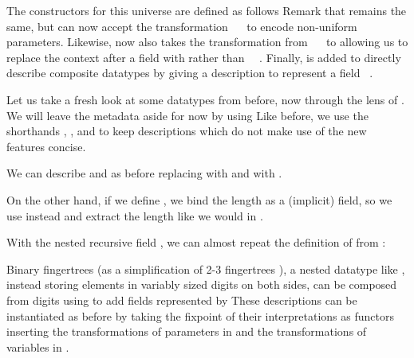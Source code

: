 The constructors for this universe are defined as follows
Remark that  remains the same, but  can now accept the transformation \ \  to encode non-uniform parameters. Likewise,  now also takes the transformation  from \ \  to  allowing us to replace the context after a field with  rather than \ \ . Finally,  is added to directly describe composite datatypes by giving a description  to represent a field \ .

Let us take a fresh look at some datatypes from before, now through the lens of . We will leave the metadata aside for now by using
Like before, we use the shorthands , , and  to keep descriptions which do not make use of the new features concise. 

We can describe \bN{} and  as before
replacing  with  and  with .

On the other hand, if we define , we bind the length as a (implicit) field, so we use  instead
and extract the length  like we would in .

With the nested recursive field , we can almost repeat the definition of  from :

Binary fingertrees (as a simplification of 2-3 fingertrees \cite{fingertrees}), a nested datatype like , instead storing elements in variably sized digits on both sides, can be composed from digits
using  to add fields represented by 
These descriptions can be instantiated as before by taking the fixpoint%
of their interpretations as functors
inserting the transformations of parameters  in  and the transformations of variables  in .

